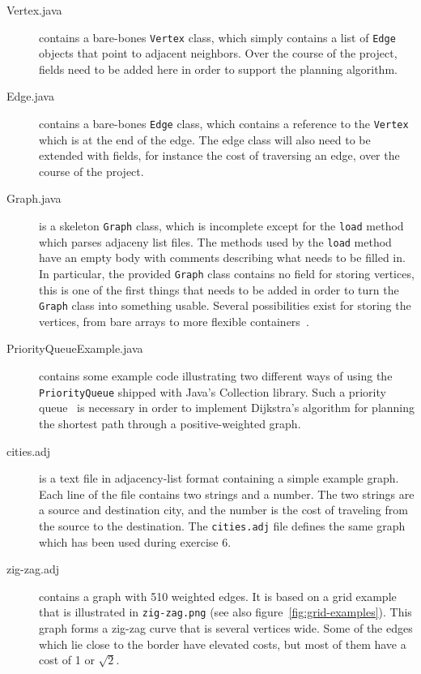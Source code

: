 \documentclass[a4paper,10pt]{article}
\begin{document}
\begin{description}

\item[Vertex.java]
  contains a bare-bones \texttt{Vertex} class, which simply contains a list of \texttt{Edge} objects that point to adjacent neighbors.
  Over the course of the project, fields need to be added here in order to support the planning algorithm.

\item[Edge.java]
  contains a bare-bones \texttt{Edge} class, which contains a reference to the \texttt{Vertex} which is at the end of the edge.
  The edge class will also need to be extended with fields, for instance the cost of traversing an edge, over the course of the project.

\item[Graph.java]
  is a skeleton \texttt{Graph} class, which is incomplete except for the \texttt{load} method which parses adjaceny list files.
  The methods used by the \texttt{load} method have an empty body with comments describing what needs to be filled in.
  In particular, the provided \texttt{Graph} class contains no field for storing vertices, this is one of the first things that needs to be added in order to turn the \texttt{Graph} class into something usable.
  Several possibilities exist for storing the vertices, from bare arrays to more flexible containers~\cite{java:linked-list,java:array-list,java:hash-set,java:tree-set,java:hash-map,java:tree-map}.
  
\item[PriorityQueueExample.java]
  contains some example code illustrating two different ways of using the \texttt{PriorityQueue} shipped with Java's Collection library.
  Such a priority queue~\cite{wikipedia:priority-queue} is necessary in order to implement Dijkstra's algorithm for planning the shortest path through a positive-weighted graph.
  
\item[cities.adj]
  is a text file in adjacency-list format containing a simple example graph.
  Each line of the file contains two strings and a number.
  The two strings are a source and destination city, and the number is the cost of traveling from the source to the destination.
  The \texttt{cities.adj} file defines the same graph which has been used during exercise 6.
  
\item[zig-zag.adj]
  contains a graph with 510 weighted edges.
  It is based on a grid example that is illustrated in \texttt{zig-zag.png} (see also figure~\ref{fig:grid-examples}).
  This graph forms a zig-zag curve that is several vertices wide.
  Some of the edges which lie close to the border have elevated costs, but most of them have a cost of 1 or $\sqrt{2}$.
  

\end{description}
\end{document}
